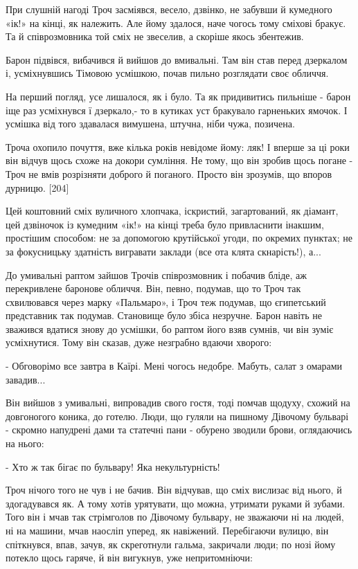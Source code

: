 При слушній нагоді Троч засміявся, весело, дзвінко, не забувши й кумедного «ік!» на кінці, як належить. Але йому здалося, наче чогось тому сміхові бракує. Та й співрозмовника той сміх не звеселив, а скоріше якось збентежив.

Барон підвівся, вибачився й вийшов до вмивальні. Там він став перед дзеркалом і, усміхнувшись Тімовою усмішкою, почав пильно розглядати своє обличчя.

На перший погляд, усе лишалося, як і було. Та як придивитись пильніше - барон іще раз усміхнувся ї дзеркало,- то в кутиках уст бракувало гарненьких ямочок. І усмішка від того здавалася вимушена, штучна, ніби чужа, позичена.

Троча охопило почуття, вже кілька років невідоме йому: ляк! І вперше за ці роки він відчув щось схоже на докори сумління. Не тому, що він зробив щось погане - Троч не вмів розрізняти доброго й поганого. Просто він зрозумів, що впоров дурницю. [204]

Цей коштовний сміх вуличного хлопчака, іскристий, загартований, як діамант, цей дзвіночок із кумедним «ік!» на кінці треба було привласнити інакшим, простішим способом: не за допомогою крутійської угоди, по окремих пунктах; не за фокусницьку здатність вигравати заклади (все ота клята скнарість!), а...

До умивальні раптом зайшов Трочів співрозмовник і побачив бліде, аж перекривлене баронове обличчя. Він, певно, подумав, що то Троч так схвилювався через марку «Пальмаро», і Троч теж подумав, що єгипетський представник так подумав. Становище було збіса незручне. Барон навіть не зважився вдатися знову до усмішки, бо раптом його взяв сумнів, чи він зуміє усміхнутися. Тому він сказав, дуже незграбно вдаючи хворого:

- Обговорімо все завтра в Каїрі. Мені чогось недобре. Мабуть, салат з омарами завадив...

Він вийшов з умивальні, випровадив свого гостя, тоді помчав щодуху, схожий на довгоногого коника, до готелю. Люди, що гуляли на пишному Дівочому бульварі - скромно напудрені дами та статечні пани - обурено зводили брови, оглядаючись на нього:

- Хто ж так бігає по бульвару! Яка некультурність!

Троч нічого того не чув і не бачив. Він відчував, що сміх вислизає від нього, й здогадувався як. А тому хотів урятувати, що можна, утримати руками й зубами. Того він і мчав так стрімголов по Дівочому бульвару, не зважаючи ні на людей, ні на машини, мчав наосліп уперед, як навіжений. Перебігаючи вулицю, він спіткнувся, впав, зачув, як скреготнули гальма, закричали люди; по нозі йому потекло щось гаряче, й він вигукнув, уже непритомніючи:

